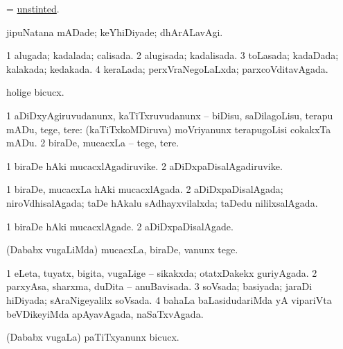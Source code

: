 \bentry
{} 
\gl{\gu}
\expl{}
\bmng
= \hyperlink{unstinted}{unstinted}. 
\emng
\eentry

\bentry
{} 
\gl{\kirxvi}
\bmng
jipuNatana mADade; keYhiDiyade; dhArALavAgi. 
\emng
\eentry

\bentry
{} 
\gl{\gu}
\expl{}
\bmng
\bnum
\num{1} alugada; kadalada; calisada. 
\num{2} alugisada; kadalisada. 
\num{3} toLasada; kadaDada; kalakada; kedakada. 
\num{4} keraLada; perxVraNegoLaLxda; parxcoVditavAgada. 
\enum
\emng
\eentry

\bentry
{} 
\gl{\akirx}
\expl{}
\bmng
holige bicucx. 
\emng
\eentry

\bentry
{} 
\gl{\akirx}
\bmng
\bnum
\num{1} aDiDxyAgiruvudanunx, kaTiTxruvudanunx -- biDisu, saDilagoLisu, terapu mADu, tege, tere:  (kaTiTxkoMDiruva) moVriyanunx terapugoLisi cokakxTa mADu. 
\num{2} biraDe, mucacxLa -- tege, tere. 
\enum
\emng
\eentry

\bentry
{} 
\gl{\nA}
\expl{}
\bmng
\bnum
\num{1} biraDe hAki mucacxlAgadiruvike. 
\num{2} aDiDxpaDisalAgadiruvike. 
\enum
\emng
\eentry

\bentry
{} 
\gl{\gu}
\expl{}
\bmng
\bnum
\num{1} biraDe, mucacxLa hAki mucacxlAgada. 
\num{2} aDiDxpaDisalAgada; niroVdhisalAgada; taDe hAkalu sAdhayxvilalxda; taDedu nililxsalAgada. 
\enum
\emng
\eentry

\bentry
{} 
\gl{\kirxvi}
\expl{}
\bmng
\bnum
\num{1} biraDe hAki mucacxlAgade. 
\num{2} aDiDxpaDisalAgade. 
\enum
\emng
\eentry

\bentry
{} 
\gl{\sakirx}
\expl{}
\bmng
(Dababx \mo vugaLiMda) mucacxLa, biraDe, \mo vanunx tege. 
\emng
\eentry

\bentry
{} 
\gl{\gu}
\expl{}
\bmng
\bnum
\num{1} eLeta, tuyatx, bigita, \mo vugaLige -- sikakxda; otatxDakekx guriyAgada. 
\num{2} parxyAsa, sharxma, duDita -- anuBavisada. 
\num{3} soVsada; basiyada; jaraDi hiDiyada; sAraNigeyalilx soVsada. 
\num{4} bahaLa baLasidudariMda yA vipariVta beVDikeyiMda apAyavAgada, naSaTxvAgada. 
\enum
\emng
\eentry

\bentry
{} 
\gl{\sakirx}
\bmng
(Dababx \mo vugaLa) paTiTxyanunx bicucx. 
\emng
\eentry

